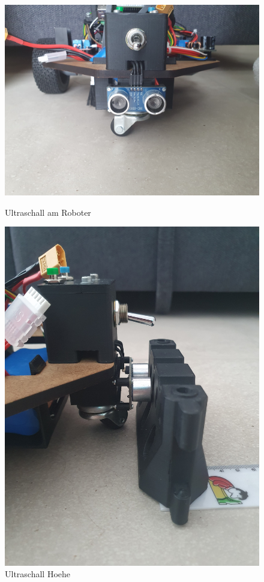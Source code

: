 \begin{figure}[H]
\centering
\begin{minipage}[b]{0.45\textwidth}
  \centering
  \includegraphics[width=\textwidth]{assets/ET/ultraschall/ultraschall.jpg}
  \caption{Ultraschall am Roboter}
  \label{fig:ultraschall-robi}
\end{minipage}
\hspace{0.05\textwidth} %
\begin{minipage}[b]{0.45\textwidth}
  \centering
  \includegraphics[width=\textwidth, angle=-90]{assets/ET/ultraschall/ultraschall-side.jpg}
  \caption{Ultraschall Hoehe}
  \label{fig:ultraschall-hoehe}
\end{minipage}
\end{figure}


